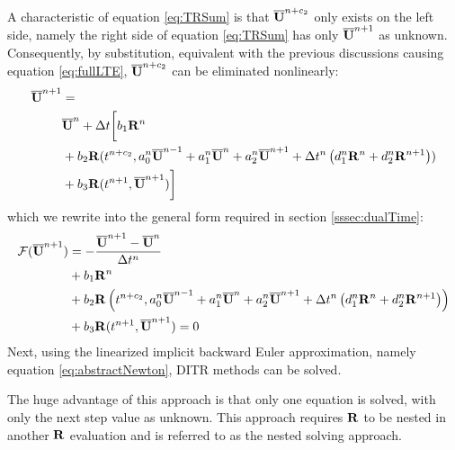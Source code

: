 \documentclass[preprint,12pt]{elsarticle}
\begin{document}
A characteristic of equation \eqref{eq:TRSum} is that
$\overline{\mathbf{U}}^{n+c_2}$ only exists on the left side, namely the
right side of equation \eqref{eq:TRSum} has only $\overline{\mathbf{U}}^{n+1}$ as
unknown. Consequently, by substitution, equivalent
with the previous discussions causing equation \eqref{eq:fullLTE},
$\overline{\mathbf{U}}^{n+c_2}$ can be eliminated nonlinearly:
\begin{equation}
    \begin{aligned}
        \overline{\mathbf{U}}^{n+1} & =                       \\
                  & \overline{\mathbf{U}}^{n} + \mathrm\Delta t\biggl[
        b_1 \mathbf{R}^n                            \\
                  & +
            b_2 \mathbf{R}(t^{n+c_2},a^n_0\overline{\mathbf{U}}^{n - 1} +
            a^n_1\overline{\mathbf{U}}^{n} +
            a^n_2\overline{\mathbf{U}}^{n + 1}
            +
            \mathrm\Delta t^n
            \left(
            d^n_1\mathbf{R}^{n} +
            d^n_2\mathbf{R}^{n + 1}
        \right))                            \\
                  & +
            b_3 \mathbf{R}(t^{n+1},\overline{\mathbf{U}}^{n+1})
            \biggr]
        \label{eq:nestedDITR}
    \end{aligned}
\end{equation}
which we rewrite into the general form required in section \ref{sssec:dualTime}:
\begin{equation}
    \begin{aligned}
        \mathcal{F}(\overline{\mathbf{U}}^{n+1}) & = -\frac{\overline{\mathbf{U}}^{n+1} - \overline{\mathbf{U}}^{n}}{\mathrm\Delta t^n} \\
                       & +
        b_1 \mathbf{R}^n                                                 \\
                       & +
        b_2 \mathbf{R}\left(t^{n+c_2},a^n_0\overline{\mathbf{U}}^{n - 1} +
        a^n_1\overline{\mathbf{U}}^{n} +
        a^n_2\overline{\mathbf{U}}^{n + 1}
        +
        \mathrm\Delta t^n
        \left(
        d^n_1\mathbf{R}^{n} +
        d^n_2\mathbf{R}^{n + 1}
        \right)\right)                                           \\
                       & +
        b_3 \mathbf{R}(t^{n+1},\overline{\mathbf{U}}^{n+1}) = 0
        \label{eq:nestedDITR_F}
    \end{aligned}
\end{equation}
Next, using the linearized implicit backward Euler approximation,
namely equation \eqref{eq:abstractNewton}, DITR methods can be solved.

The huge advantage of this approach is that only one equation is solved,
with only the next step value as unknown.
This approach requires $\mathbf{R}$ to be nested in another $\mathbf{R}$ evaluation and
is referred to as the nested solving approach.
\end{document}
